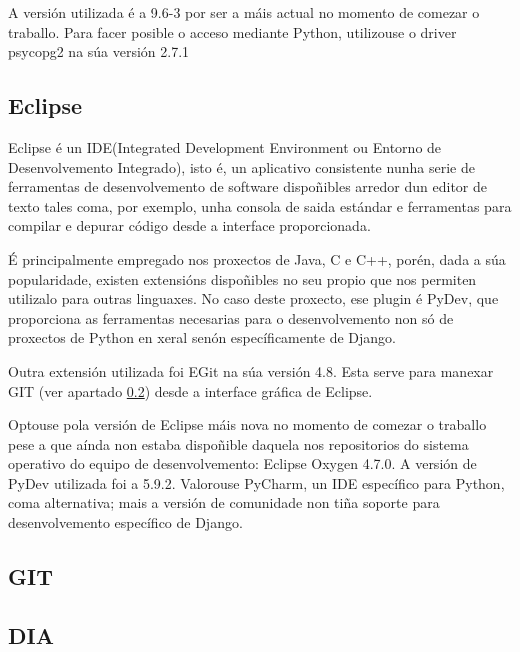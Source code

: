 A versión utilizada é a 9.6-3 por ser a máis actual no momento de comezar o traballo. Para facer posible o acceso mediante Python, utilizouse o driver psycopg2 na súa versión 2.7.1


\subsection{Eclipse}

Eclipse é un IDE(Integrated Development Environment ou Entorno de Desenvolvemento Integrado), isto é, un aplicativo consistente nunha serie de ferramentas de desenvolvemento de software dispoñibles arredor dun editor de texto tales coma, por exemplo, unha consola de saida estándar e ferramentas para compilar e depurar código desde a interface proporcionada.

É principalmente empregado nos proxectos de Java, C e C++, porén, dada a súa popularidade, existen extensións dispoñibles no seu propio  que nos permiten utilizalo para outras linguaxes. No caso deste proxecto, ese plugin é PyDev, que proporciona as ferramentas necesarias para o desenvolvemento non só de proxectos de Python en xeral senón específicamente de Django.

Outra extensión utilizada foi EGit na súa versión 4.8. Esta serve para manexar GIT (ver apartado \ref{git}) desde a interface gráfica de Eclipse. 

Optouse pola versión de Eclipse máis nova no momento de comezar o traballo pese a que aínda non estaba dispoñible daquela nos repositorios do sistema operativo do equipo de desenvolvemento: Eclipse Oxygen 4.7.0. A versión de PyDev utilizada foi a 5.9.2. Valorouse PyCharm, un IDE específico para Python, coma alternativa; mais a versión de comunidade non tiña soporte para desenvolvemento específico de Django\cite{pycharm}.
 


\subsection{GIT}
\label{git}

\subsection{DIA}
